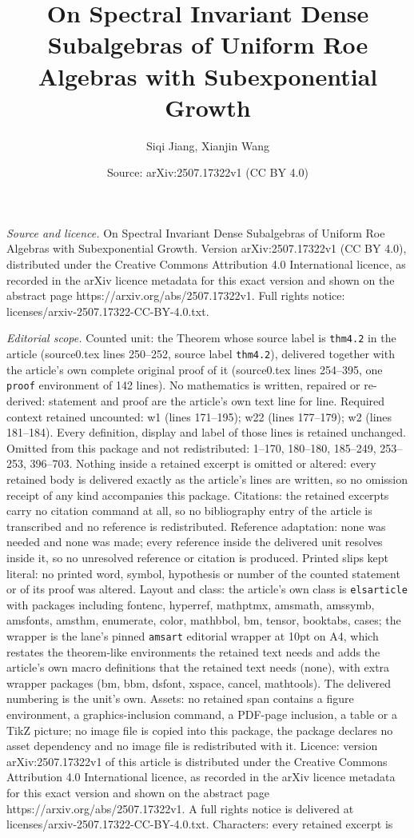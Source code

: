 \documentclass[10pt,a4paper]{amsart}
\title[On Spectral Invariant Dense Subalgebras of Uniform Roe Algeb]{On Spectral Invariant Dense Subalgebras of Uniform Roe Algebras with Subexponential Growth}
\author{Siqi Jiang, Xianjin Wang}
\date{Source: arXiv:2507.17322v1 (CC BY 4.0)}
\begin{document}
\maketitle

\noindent\emph{Source and licence.} On Spectral Invariant Dense Subalgebras of Uniform Roe Algebras with Subexponential Growth. Version arXiv:2507.17322v1 (CC BY 4.0), distributed under the Creative Commons Attribution 4.0 International licence, as recorded in the arXiv licence metadata for this exact version and shown on the abstract page https://arxiv.org/abs/2507.17322v1. Full rights notice: licenses/arxiv-2507.17322-CC-BY-4.0.txt.\par\smallskip

\noindent\textit{Editorial scope.} Counted unit: the Theorem whose source label is \texttt{thm4.2} in the article (source0.tex lines 250--252, source label \texttt{thm4.2}), delivered together with the article's own complete original proof of it (source0.tex lines 254--395, one \texttt{proof} environment of 142 lines). No mathematics is written, repaired or re-derived: statement and proof are the article's own text line for line. Required context retained uncounted: w1 (lines 171--195); w22 (lines 177--179); w2 (lines 181--184). Every definition, display and label of those lines is retained unchanged. Omitted from this package and not redistributed: 1--170, 180--180, 185--249, 253--253, 396--703. Nothing inside a retained excerpt is omitted or altered: every retained body is delivered exactly as the article's lines are written, so no omission receipt of any kind accompanies this package. Citations: the retained excerpts carry no citation command at all, so no bibliography entry of the article is transcribed and no reference is redistributed. Reference adaptation: none was needed and none was made; every reference inside the delivered unit resolves inside it, so no unresolved reference or citation is produced. Printed slips kept literal: no printed word, symbol, hypothesis or number of the counted statement or of its proof was altered. Layout and class: the article's own class is \texttt{elsarticle} with packages including fontenc, hyperref, mathptmx, amsmath, amssymb, amsfonts, amsthm, enumerate, color, mathbbol, bm, tensor, booktabs, cases; the wrapper is the lane's pinned \texttt{amsart} editorial wrapper at 10pt on A4, which restates the theorem-like environments the retained text needs and adds the article's own macro definitions that the retained text needs (none), with extra wrapper packages (bm, bbm, dsfont, xspace, cancel, mathtools). The delivered numbering is the unit's own. Assets: no retained span contains a figure environment, a graphics-inclusion command, a PDF-page inclusion, a table or a TikZ picture; no image file is copied into this package, the package declares no asset dependency and no image file is redistributed with it. Licence: version arXiv:2507.17322v1 of this article is distributed under the Creative Commons Attribution 4.0 International licence, as recorded in the arXiv licence metadata for this exact version and shown on the abstract page https://arxiv.org/abs/2507.17322v1. A full rights notice is delivered at licenses/arxiv-2507.17322-CC-BY-4.0.txt. Characters: every retained excerpt is 
\end{document}
